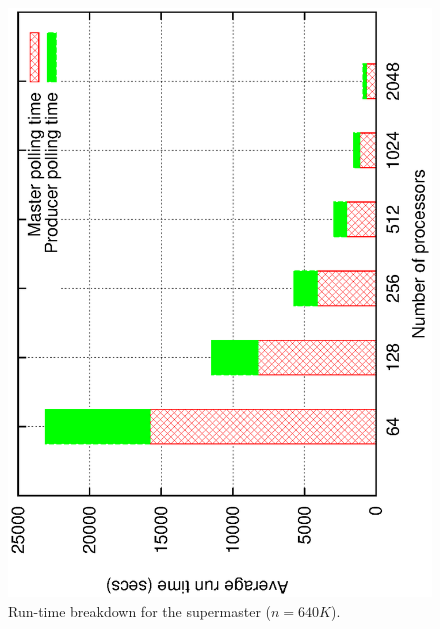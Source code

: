 \documentclass[10pt,journal,letterpaper,compsoc]{IEEEtran}
\begin{document}
\begin{figure}[thb]
\centerline{
						\includegraphics[angle=-90, scale=0.5]{spBreak.eps}
            }
\caption{
Run-time breakdown for the supermaster ($n=640K$).
}
\label{figSupermasterBreakdown}
\end{figure}
\end{document}
